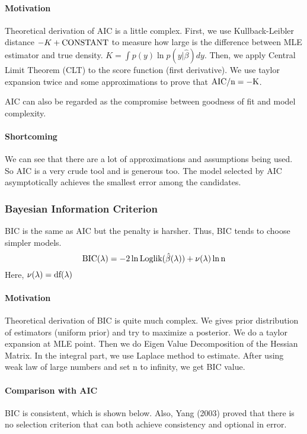 \documentclass[]{article}
\begin{document}
\paragraph{Motivation}
Theoretical derivation of AIC is a little complex. First, we use Kullback-Leibler distance $ -K+\rm CONSTANT $ to measure how large is the difference between MLE estimator and true density. $ K=\int p(y) \ln p(y|\hat{\beta})dy $. Then, we apply Central Limit Theorem (CLT) to the score function (first derivative). We use taylor expansion twice and some approximations to prove that $ \rm AIC/n=-K $.

AIC can also be regarded as the compromise between goodness of fit and model complexity.

\paragraph{Shortcoming}
We can see that there are a lot of approximations and assumptions being used. So AIC is a very crude tool and is generous too. The model selected by AIC asymptotically achieves the smallest error among the candidates.
\subsubsection{Bayesian Information Criterion}
BIC is the same as AIC but the penalty is harsher. Thus, BIC tends to choose simpler models.
\begin{equation}
\rm BIC(\lambda)=-2\ln \rm Loglik(\hat{\beta}(\lambda))+\nu(\lambda) \ln n
\end{equation}
Here, $ \nu(\lambda)=\rm df(\lambda) $

\paragraph{Motivation}
Theoretical derivation of BIC is quite much complex. We gives prior distribution of estimators (uniform prior) and try to maximize a posterior. We do a taylor expansion at MLE point. Then we do Eigen Value Decomposition of the Hessian Matrix. In the integral part, we use Laplace method to estimate. After using weak law of large numbers and set n to infinity, we get BIC value.
\paragraph{Comparison with AIC}
BIC is consistent\cite{burnham2004multimodel}, which is shown below. Also, Yang (2003)\cite{yang2005can} proved that there is no selection criterion that can both achieve consistency and optional in error.
\end{document}
